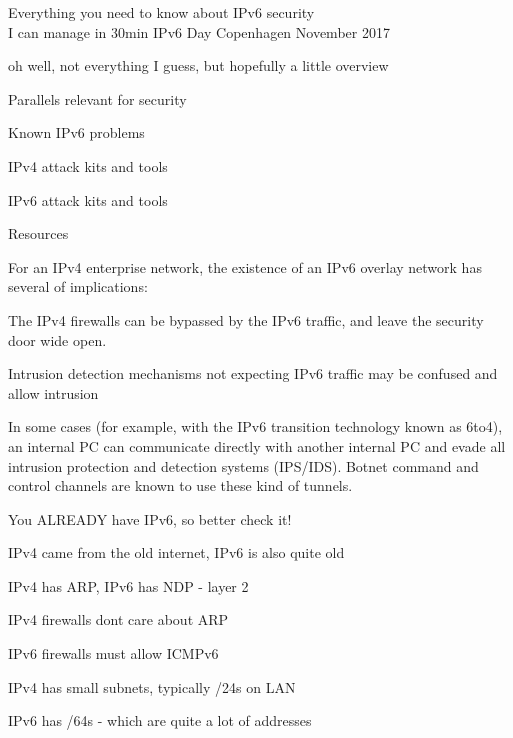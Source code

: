 \documentclass[18pt,landscape,a4paper,footrule]{foils}
\begin{document}
\mytitlepage
{Everything you need to know about IPv6 security\\I can manage in 30min}
{IPv6 Day Copenhagen November 2017}


oh well, not everything I guess, but hopefully a little overview

\begin{list2}
\item Parallels relevant for security
\item Known IPv6 problems
\item IPv4 attack kits and tools
\item IPv6 attack kits and tools
\item Resources
\end{list2}



\begin{list1}
\item For an IPv4 enterprise network, the existence of an IPv6 overlay network has several of implications:
\begin{list2}
\item The IPv4 firewalls can be bypassed by the IPv6 traffic, and leave the security door wide open.
\item Intrusion detection mechanisms not expecting IPv6 traffic may be confused and allow intrusion
\item In some cases (for example, with the IPv6 transition technology known as 6to4), an internal PC can communicate directly with another internal PC and evade all intrusion protection and detection systems (IPS/IDS). Botnet command and control channels are known to use these kind of tunnels.
\end{list2}
\end{list1}

\vskip 1cm
\centerline{You ALREADY have IPv6, so better check it!}


IPv4 came from the old internet, IPv6 is also quite old
\begin{list2}
\item IPv4 has ARP, IPv6 has NDP - layer 2
\item IPv4 firewalls dont care about ARP
\item IPv6 firewalls must allow ICMPv6\\
\item IPv4 has small subnets, typically /24s on LAN
\item IPv6 has /64s - which are quite a lot of addresses
\end{list2}
\end{document}
